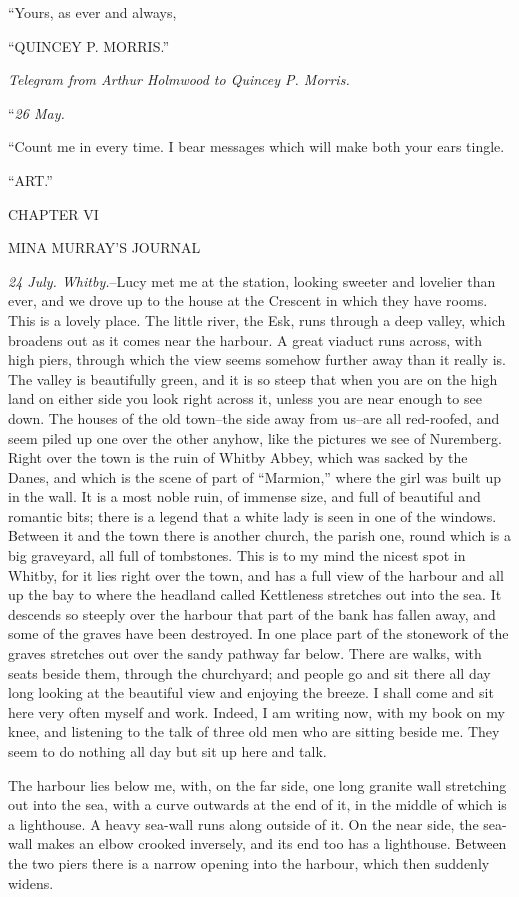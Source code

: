 \documentclass[12pt,openright]{book}
\begin{document}
“Yours, as ever and always,

“QUINCEY P. MORRIS.”

\textit{Telegram from Arthur Holmwood to Quincey P. Morris.}

“\textit{26 May.}

“Count me in every time. I bear messages which will make both your ears tingle.

“ART.”

CHAPTER VI

MINA MURRAY’S JOURNAL

\textit{24 July. Whitby.}–Lucy met me at the station, looking sweeter and lovelier than ever, and we drove up to the house at the Crescent in which they have rooms. This is a lovely place. The little river, the Esk, runs through a deep valley, which broadens out as it comes near the harbour. A great viaduct runs across, with high piers, through which the view seems somehow further away than it really is. The valley is beautifully green, and it is so steep that when you are on the high land on either side you look right across it, unless you are near enough to see down. The houses of the old town–the side away from us–are all red-roofed, and seem piled up one over the other anyhow, like the pictures we see of Nuremberg. Right over the town is the ruin of Whitby Abbey, which was sacked by the Danes, and which is the scene of part of “Marmion,” where the girl was built up in the wall. It is a most noble ruin, of immense size, and full of beautiful and romantic bits; there is a legend that a white lady is seen in one of the windows. Between it and the town there is another church, the parish one, round which is a big graveyard, all full of tombstones. This is to my mind the nicest spot in Whitby, for it lies right over the town, and has a full view of the harbour and all up the bay to where the headland called Kettleness stretches out into the sea. It descends so steeply over the harbour that part of the bank has fallen away, and some of the graves have been destroyed. In one place part of the stonework of the graves stretches out over the sandy pathway far below. There are walks, with seats beside them, through the churchyard; and people go and sit there all day long looking at the beautiful view and enjoying the breeze. I shall come and sit here very often myself and work. Indeed, I am writing now, with my book on my knee, and listening to the talk of three old men who are sitting beside me. They seem to do nothing all day but sit up here and talk.

The harbour lies below me, with, on the far side, one long granite wall stretching out into the sea, with a curve outwards at the end of it, in the middle of which is a lighthouse. A heavy sea-wall runs along outside of it. On the near side, the sea-wall makes an elbow crooked inversely, and its end too has a lighthouse. Between the two piers there is a narrow opening into the harbour, which then suddenly widens.
\end{document}
